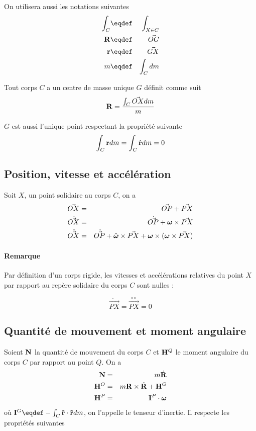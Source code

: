 On utilisera aussi les notations suivantes
\begin{eqnarray*}
  \int_C &\eqdef& \int_{X \in C}\\
  \xg &\eqdef& \vec{OG}\\
  \fv{r} &\eqdef& \vec{GX}\\
  m &\eqdef& \int_C dm
\end{eqnarray*}

Tout corps $C$ a un centre de masse unique $G$ définit comme suit
\[ {\bf R} = \frac{\int_C \vec{OX} dm}{m} \]

$G$ est aussi l'unique point respectant la propriété suivante
\[ \int_C {\bf r} dm = \int_C \dot{\bf r} dm = 0 \]

\subsection{Position, vitesse et accélération}
Soit $X$, un point solidaire au corps $C$, on a
\begin{eqnarray*}
	\vec{OX} 		&=&	\vec{OP} + \vec{PX}\\
  \dot{\vec{ OX}} 	&=& \dot{\vec{ OP}} + {\bm \omega} \times \vec{PX}\\
  \ddot{\vec{ OX}} 	&=& \ddot{\vec{ OP}} + \mathring{\bm \omega} \times \vec{PX} + {\bm \omega} \times ({\bm \omega} \times \vec{PX})
\end{eqnarray*}

\paragraph{Remarque}
Par définition d'un corps rigide, les vitesses et accélérations relatives du point $X$
par rapport au repère solidaire du corps $C$ sont nulles :

$$\mathring{\vec{PX}} = \overset{\circ\circ}{\vec{PX}} = 0$$

\subsection{Quantité de mouvement et moment angulaire}
Soient ${\bf N}$ la quantité de mouvement du corps $C$ et ${\bf H}^Q$ le moment angulaire du corps $C$ par rapport au point $Q$.
On a
\begin{eqnarray*}
  {\bf N} &=& m \dot{\bf R}\\
  {\bf H}^O &=& m {\bf R} \times \dot{\bf R} + {\bf H}^G\\
  {\bf H}^P &=& {\bf I}^P \cdot {\bm \omega}
\end{eqnarray*}
où $\ine^G \eqdef -\int_C \tilde{\fv{r}}\cdot\tilde{\fv{r}} dm$, on l'appelle le tenseur d'inertie.
Il respecte les propriétés suivantes


